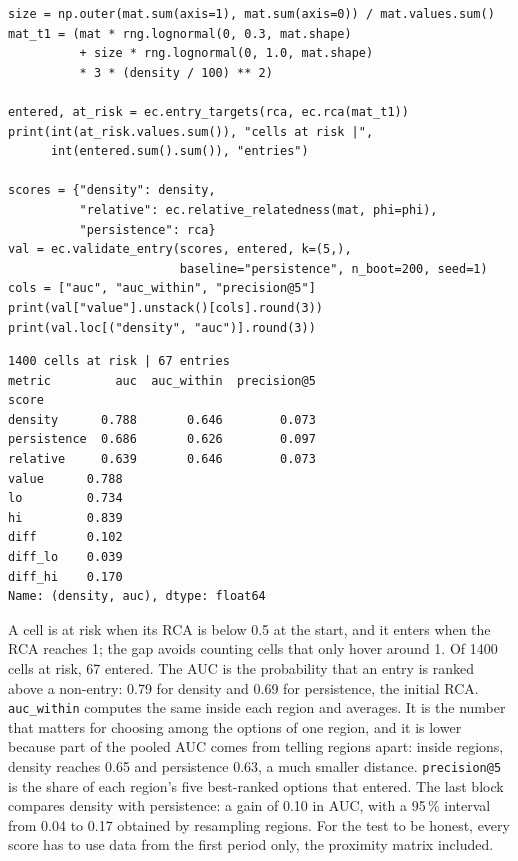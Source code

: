 \begin{lstlisting}
size = np.outer(mat.sum(axis=1), mat.sum(axis=0)) / mat.values.sum()
mat_t1 = (mat * rng.lognormal(0, 0.3, mat.shape)
          + size * rng.lognormal(0, 1.0, mat.shape)
          * 3 * (density / 100) ** 2)

entered, at_risk = ec.entry_targets(rca, ec.rca(mat_t1))
print(int(at_risk.values.sum()), "cells at risk |",
      int(entered.sum().sum()), "entries")

scores = {"density": density,
          "relative": ec.relative_relatedness(mat, phi=phi),
          "persistence": rca}
val = ec.validate_entry(scores, entered, k=(5,),
                        baseline="persistence", n_boot=200, seed=1)
cols = ["auc", "auc_within", "precision@5"]
print(val["value"].unstack()[cols].round(3))
print(val.loc[("density", "auc")].round(3))
\end{lstlisting}
\begin{lstlisting}[language={}, numbers=none, backgroundcolor=\color{white}, frame=leftline, framerule=2pt, rulecolor=\color{noteborder}, xleftmargin=1.5em]
1400 cells at risk | 67 entries
metric         auc  auc_within  precision@5
score                                      
density      0.788       0.646        0.073
persistence  0.686       0.626        0.097
relative     0.639       0.646        0.073
value      0.788
lo         0.734
hi         0.839
diff       0.102
diff_lo    0.039
diff_hi    0.170
Name: (density, auc), dtype: float64
\end{lstlisting}

A cell is at risk when its RCA is below 0.5 at the start, and it
enters when the RCA reaches 1; the gap avoids counting cells that only
hover around 1. Of 1400 cells at risk,
67 entered. The AUC is the probability that an
entry is ranked above a non-entry: 0.79
for density and 0.69 for
persistence, the initial RCA. \texttt{auc\_within} computes the same
inside each region and averages. It is the number that matters for
choosing among the options of one region, and it is lower because part
of the pooled AUC comes from telling regions apart: inside regions,
density reaches 0.65 and
persistence 0.63, a much
smaller distance.
\texttt{precision@5} is the share of each region's five best-ranked
options that entered. The last block compares density with persistence:
a gain of 0.10 in AUC, with a 95\,\%
interval from 0.04 to
0.17 obtained by resampling
regions. For the test to be honest, every score has to use data from the
first period only, the proximity matrix included.

